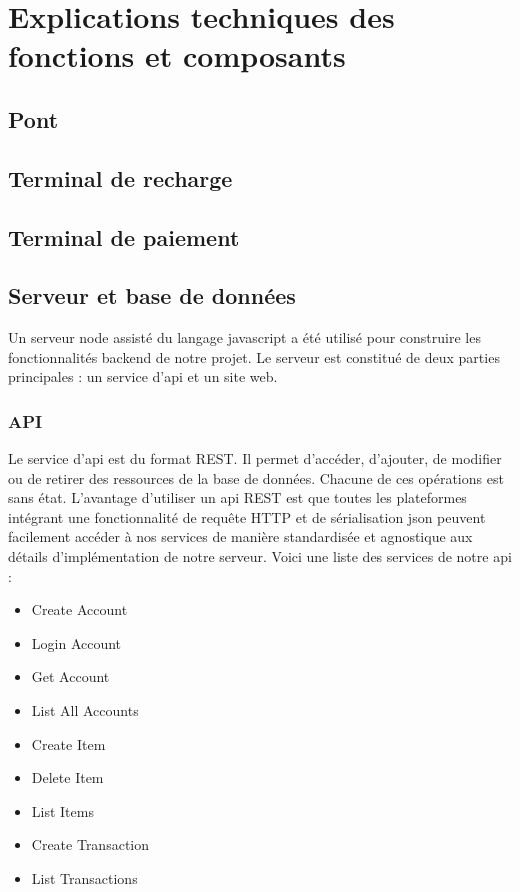 \section{Explications techniques des fonctions et composants}
	\subsection{Pont}
	\subsection{Terminal de recharge}
	\subsection{Terminal de paiement}
	\subsection{Serveur et base de données}
		Un serveur \og node \fg{} assisté du langage javascript a été utilisé pour construire les fonctionnalités \og backend \fg{} de notre projet. Le serveur est constitué de deux parties principales : un service d’api et un site web. 
		
		\subsubsection{API}
		Le service d’api est du format REST. Il permet d’accéder, d’ajouter, de modifier ou de retirer des ressources de la base de données. Chacune de ces opérations est sans état. L’avantage d’utiliser un api REST est que toutes les plateformes intégrant une fonctionnalité de requête HTTP et de sérialisation json peuvent facilement accéder à nos services de manière standardisée et agnostique aux détails d’implémentation de notre serveur. Voici une liste des services de notre api : %
		\begin{multicols}{3}
		\begin{itemize}
			\item Create Account
			\item Login Account
			\item Get Account
			\item List All Accounts
			\item Create Item
			\item Delete Item
			\item List Items
			\item Create Transaction
			\item List Transactions
		\end{itemize}
		\end{multicols}

